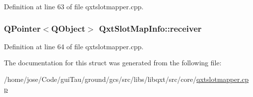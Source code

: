 Definition at line 63 of file qxtslotmapper.\-cpp.

\hypertarget{struct_qxt_slot_map_info_a4c93e0778f262f8a350e46a310d9f3c3}{
\subsubsection[{receiver}]{\setlength{\rightskip}{0pt plus 5cm}Q\-Pointer$<$Q\-Object$>$ Qxt\-Slot\-Map\-Info\-::receiver}}\label{struct_qxt_slot_map_info_a4c93e0778f262f8a350e46a310d9f3c3}


Definition at line 64 of file qxtslotmapper.\-cpp.



The documentation for this struct was generated from the following file\-:\begin{DoxyCompactItemize}
\item 
/home/jose/\-Code/gui\-Tau/ground/gcs/src/libs/libqxt/src/core/\hyperlink{qxtslotmapper_8cpp}{qxtslotmapper.\-cpp}\end{DoxyCompactItemize}
